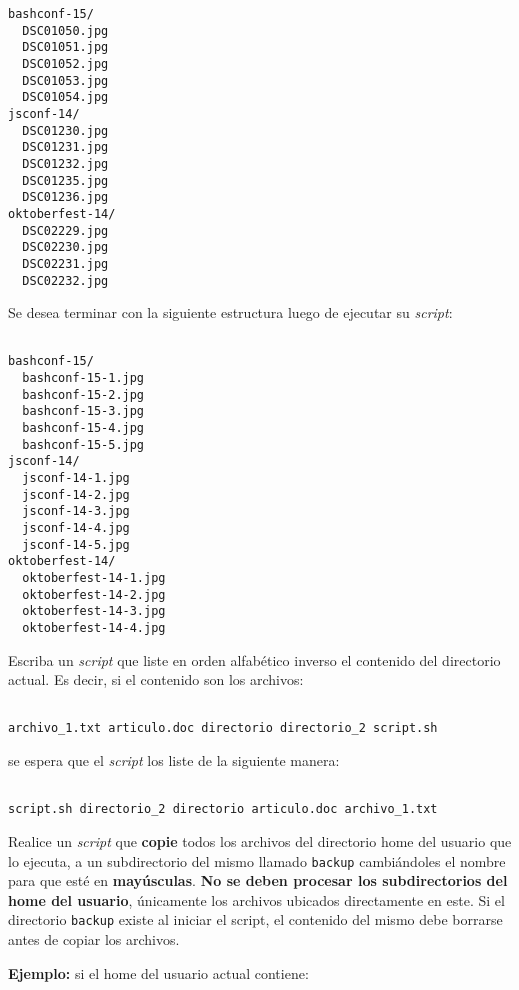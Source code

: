 \begin{questions}
\begin{lstlisting}
bashconf-15/
  DSC01050.jpg
  DSC01051.jpg
  DSC01052.jpg
  DSC01053.jpg
  DSC01054.jpg
jsconf-14/
  DSC01230.jpg
  DSC01231.jpg
  DSC01232.jpg
  DSC01235.jpg
  DSC01236.jpg
oktoberfest-14/
  DSC02229.jpg
  DSC02230.jpg
  DSC02231.jpg
  DSC02232.jpg

  \end{lstlisting}

  Se desea terminar con la siguiente estructura luego de ejecutar su \textit{script}:

  \begin{lstlisting}

bashconf-15/
  bashconf-15-1.jpg
  bashconf-15-2.jpg
  bashconf-15-3.jpg
  bashconf-15-4.jpg
  bashconf-15-5.jpg
jsconf-14/
  jsconf-14-1.jpg
  jsconf-14-2.jpg
  jsconf-14-3.jpg
  jsconf-14-4.jpg
  jsconf-14-5.jpg
oktoberfest-14/
  oktoberfest-14-1.jpg
  oktoberfest-14-2.jpg
  oktoberfest-14-3.jpg
  oktoberfest-14-4.jpg

  \end{lstlisting}

\question Escriba un \textit{script} que liste en orden alfabético inverso el contenido
  del directorio actual. Es decir, si el contenido son los archivos:

  \begin{lstlisting}

archivo_1.txt articulo.doc directorio directorio_2 script.sh

  \end{lstlisting}

  se espera que el \textit{script} los liste de la siguiente manera:

  \begin{lstlisting}

script.sh directorio_2 directorio articulo.doc archivo_1.txt

  \end{lstlisting}

\question Realice un \textit{script} que \textbf{copie} todos los archivos del directorio home
  del usuario que lo ejecuta, a un subdirectorio del mismo llamado \texttt{backup} cambiándoles
  el nombre para que esté en \textbf{mayúsculas}. \textbf{No se deben procesar los subdirectorios
  del home del usuario}, únicamente los archivos ubicados directamente en este. Si el directorio
  \texttt{backup} existe al iniciar el script, el contenido del mismo debe borrarse antes de
  copiar los archivos.

  \textbf{Ejemplo:} si el home del usuario actual contiene:


\end{questions}
